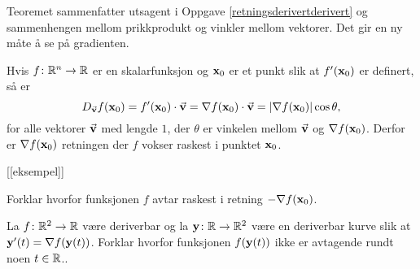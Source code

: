Teoremet sammenfatter utsagent i Oppgave \ref{retningsderivertderivert}
og sammenhengen mellom prikkprodukt og vinkler mellom vektorer. Det gir en ny
måte å se på gradienten. 
\begin{teorem}
  Hvis $f\colon \mathbb{R}^n \to \mathbb{R}$ er en skalarfunksjon og $\mathbf{x}_0$ er et punkt slik
  at $f'(\mathbf{x}_0)$ er definert, så er
  $$D_{\vec{\mathbf{v}}} f(\mathbf{x}_0) = f'(\mathbf{x}_0) \cdot \vec{\mathbf{v}} = \nabla f(\mathbf{x}_0) \cdot
  \vec{\mathbf{v}} = |\nabla f(\mathbf{x}_0)| \cos \theta,$$
  for alle vektorer $\vec{\mathbf{v}}$ med lengde $1$, der $\theta$ er vinkelen mellom $\vec{\mathbf{v}}$ og $\nabla f(\mathbf{x}_0)$.
  Derfor er $\nabla f(\mathbf{x}_0)$ retningen der $f$ vokser raskest i punktet $\mathbf{x}_0$.
\end{teorem}
[[eksempel]]

\begin{oppgave}
  Forklar hvorfor funksjonen $f$ avtar raskest i retning $-\nabla f(\mathbf{x}_0)$.
\end{oppgave}
\begin{oppgave}
  La $f \colon \mathbb{R}^2 \to \mathbb{R}$ være deriverbar og la $\mathbf{y} \colon \mathbb{R} \to \mathbb{R}^2$ være en deriverbar kurve slik at 
  $\mathbf{y}'(t) = \nabla f(\mathbf{y}(t))$. Forklar hvorfor funksjonen $f(\mathbf{y}(t))$ ikke er avtagende rundt noen $t \in \mathbb{R}$..
\end{oppgave}




